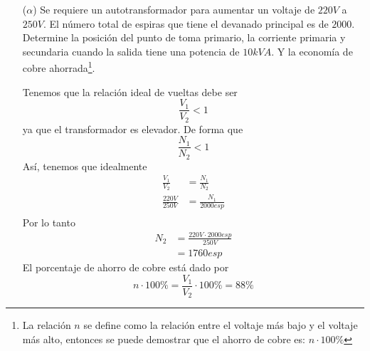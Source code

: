 \documentclass[11pt]{report}
\begin{document}
\begin{enumerate}
    \item[($\alpha$)] Se requiere un autotransformador para aumentar un voltaje de $220V$ a $250V$.
        El número total de espiras que tiene el devanado principal es de $2000$. Determine 
        la posición del punto de toma primario, la corriente primaria y secundaria cuando 
        la salida tiene una potencia de $10{kVA}$. Y la economía de cobre ahorrada\footnote{La 
        relación $n$ se define como la relación entre el voltaje más bajo y el voltaje más alto,
        entonces se puede demostrar que el ahorro de cobre es: $n\cdot100\%$}.

        Tenemos que la relación ideal de vueltas debe ser 
        \begin{equation}
            \frac{V_1}{V_2} < 1
        \end{equation}
        ya que el transformador es elevador. De forma que 
        \begin{equation}
            \frac{N_1}{N_2} < 1
        \end{equation}
        Así, tenemos que idealmente 
        \begin{equation}
            \begin{split}
                \frac{V_1}{V_2} &= \frac{N_1}{N_2} \\
                \frac{220V}{250V} &= \frac{N_1}{2000esp} \\
            \end{split}
        \end{equation}
        Por lo tanto 
        \begin{equation}
            \begin{split}
                N_2 &= \frac{220 V \cdot 2000esp}{250V} \\&= 1760 esp
            \end{split}
        \end{equation}        
        El porcentaje de ahorro de cobre está dado por 
        \begin{equation}
            n\cdot 100\% = \frac{V_1}{V_2}\cdot 100\% = 88\% 
        \end{equation}
    \end{enumerate}
\end{document}
